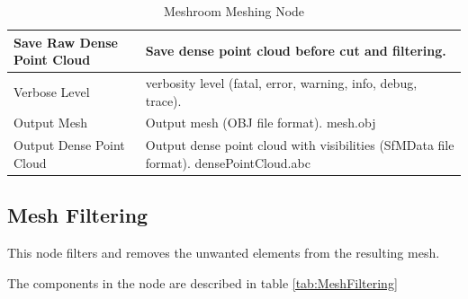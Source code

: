 \documentclass[12pt]{report}
\begin{document}
\begin{table}[H]
{\begin{tabular}{|l|l|}
    Save Raw Dense Point Cloud                & Save dense point cloud before cut and filtering.                                         \\ \hline
    Verbose Level                             & verbosity level (fatal, error, warning, info, debug, trace).                             \\ \hline
    Output Mesh                               & Output mesh (OBJ file format). mesh.obj                                                  \\ \hline
    Output Dense Point Cloud                  & Output dense point cloud with visibilities (SfMData file format). densePointCloud.abc    \\ \hline
    \end{tabular}%
    }
    \caption{Meshroom Meshing Node}
    \label{tab:Meshing}
    \end{table}
  
\newpage
\subsection{Mesh Filtering}

This node filters and removes the unwanted elements from the resulting mesh.

The components in the node are described in table \ref{tab:MeshFiltering}
\end{document}
